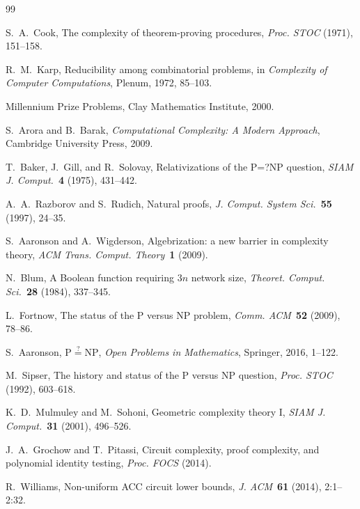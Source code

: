 \documentclass[12pt]{article}
\theoremstyle{plain}
\theoremstyle{definition}
\begin{document}

\begin{thebibliography}{99}

S.~A.~Cook,
The complexity of theorem-proving procedures,
\emph{Proc. STOC} (1971), 151--158.

R.~M.~Karp,
Reducibility among combinatorial problems,
in \emph{Complexity of Computer Computations}, Plenum, 1972, 85--103.

Millennium Prize Problems,
Clay Mathematics Institute, 2000.

S.~Arora and B.~Barak,
\emph{Computational Complexity: A Modern Approach},
Cambridge University Press, 2009.

T.~Baker, J.~Gill, and R.~Solovay,
Relativizations of the P=?NP question,
\emph{SIAM J. Comput.}\ \textbf{4} (1975), 431--442.

A.~A.~Razborov and S.~Rudich,
Natural proofs,
\emph{J. Comput. System Sci.}\ \textbf{55} (1997), 24--35.

S.~Aaronson and A.~Wigderson,
Algebrization: a new barrier in complexity theory,
\emph{ACM Trans. Comput. Theory}\ \textbf{1} (2009).

N.~Blum,
A Boolean function requiring $3n$ network size,
\emph{Theoret. Comput. Sci.}\ \textbf{28} (1984), 337--345.

L.~Fortnow,
The status of the P versus NP problem,
\emph{Comm. ACM}\ \textbf{52} (2009), 78--86.

S.~Aaronson,
$\mathrm{P} \stackrel{?}{=} \mathrm{NP}$,
\emph{Open Problems in Mathematics}, Springer, 2016, 1--122.

M.~Sipser,
The history and status of the P versus NP question,
\emph{Proc. STOC} (1992), 603--618.

K.~D.~Mulmuley and M.~Sohoni,
Geometric complexity theory I,
\emph{SIAM J. Comput.}\ \textbf{31} (2001), 496--526.

J.~A.~Grochow and T.~Pitassi,
Circuit complexity, proof complexity, and polynomial identity testing,
\emph{Proc. FOCS} (2014).

R.~Williams,
Non-uniform ACC circuit lower bounds,
\emph{J. ACM}\ \textbf{61} (2014), 2:1--2:32.


\end{thebibliography}
\end{document}
